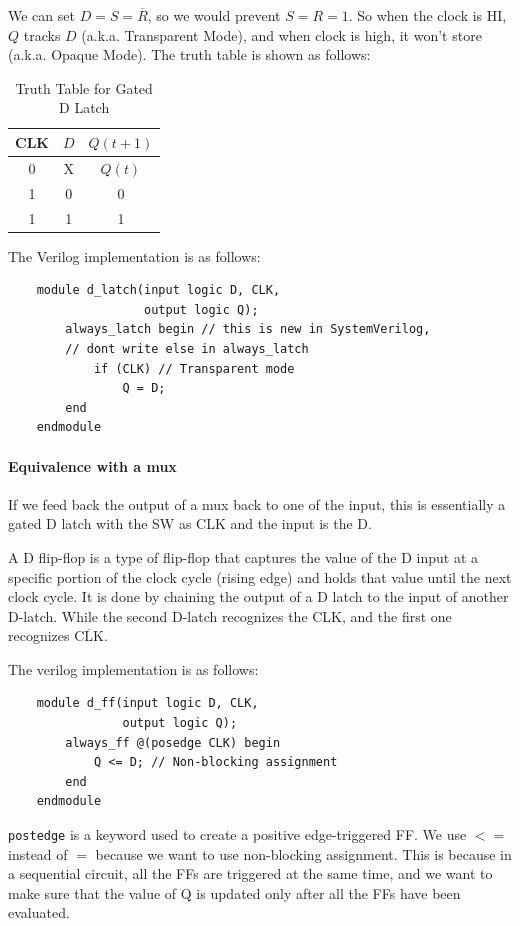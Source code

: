 \documentclass[11pt]{report}
\begin{document}
\begin{definition}
    We can set $D = S = \overline{R}$, so we would prevent $S = R = 1$. So when the clock is HI, $Q$ tracks $D$ (a.k.a. Transparent Mode), and when clock is high, it won't store (a.k.a. Opaque Mode). The truth table is shown as follows:
    \begin{table}[h!]
        \centering
        \begin{tabular}{|c|c||c|}
            \hline
            CLK & $D$ & $Q(t+1)$ \\
            \hline
            0 & X & $Q(t)$ \\
            1 & 0 & 0 \\
            1 & 1 & 1 \\ 
            \hline
        \end{tabular}
        \caption{Truth Table for Gated D Latch}
        \label{tab:gated_d_latch_truth_table}
    \end{table}

    The Verilog implementation is as follows:
    \begin{verbatim}
    module d_latch(input logic D, CLK,
                   output logic Q);
        always_latch begin // this is new in SystemVerilog, 
        // dont write else in always_latch 
            if (CLK) // Transparent mode
                Q = D;
        end
    endmodule
    \end{verbatim}
\end{definition}

\paragraph{Equivalence with a mux} If we feed back the output of a mux back to one of the input, this is essentially a gated D latch with the SW as CLK and the input is the D.

\begin{definition}
    A D flip-flop is a type of flip-flop that captures the value of the D input at a specific portion of the clock cycle (rising edge) and holds that value until the next clock cycle. It is done by chaining the output of a D latch to the input of another D-latch. While the second D-latch recognizes the CLK, and the first one recognizes $\overline{\text{CLK}}$.

    The verilog implementation is as follows:
    \begin{verbatim}
    module d_ff(input logic D, CLK,
                output logic Q);
        always_ff @(posedge CLK) begin
            Q <= D; // Non-blocking assignment
        end
    endmodule
    \end{verbatim}
    \verb|postedge| is a keyword used to create a positive edge-triggered FF. We use $<= $ instead of $= $ because we want to use non-blocking assignment. This is because in a sequential circuit, all the FFs are triggered at the same time, and we want to make sure that the value of Q is updated only after all the FFs have been evaluated.
\end{definition}
\end{document}
